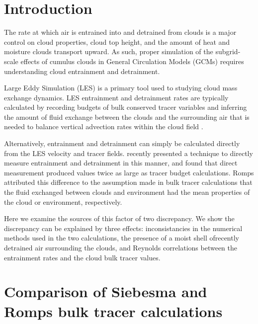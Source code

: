 \documentclass[draft,grl]{agutex}
\begin{document}
\begin{article}

%
%

\section{Introduction}

The rate at which air is entrained into and detrained from clouds is a major 
control on cloud properties, cloud top height, and the amount of heat and 
moisture clouds transport upward.  As such, proper simulation of the 
subgrid-scale effects of cumulus clouds in General Circulation Models (GCMs) 
requires understanding cloud entrainment and detrainment.

Large Eddy Simulation (LES) is a primary tool used to studying cloud mass
exchange dynamics.  LES entrainment and detrainment rates are typically 
calculated by recording budgets of bulk conserved tracer variables and 
inferring the amount of fluid exchange between the clouds and the surrounding 
air that is needed to balance vertical advection rates within the cloud field 
\citep{Siebesma1995}.

Alternatively, entrainment and detrainment can simply be calculated directly 
from the LES velocity and tracer fields.  \cite{Romps2010} recently presented 
a technique to directly measure entrainment and detrainment in this manner, 
and found that direct measurement produced values twice as large as tracer 
budget calculations.  Romps attributed this difference to the assumption made
in bulk tracer calculations that the fluid exchanged between clouds and 
environment had the mean properties of the cloud or environment, respectively.

Here we examine the sources of this factor of two discrepancy.  We show the 
discrepancy can be explained by three effects: inconsistancies in the 
numerical methods used in the two calculations, the presence of a moist shell 
ofrecently detrained air surrounding the clouds, and Reynolds correlations 
between the entrainment rates and the cloud bulk tracer values.


\section{Comparison of Siebesma and Romps bulk tracer calculations}


\end{article}
\end{document}
